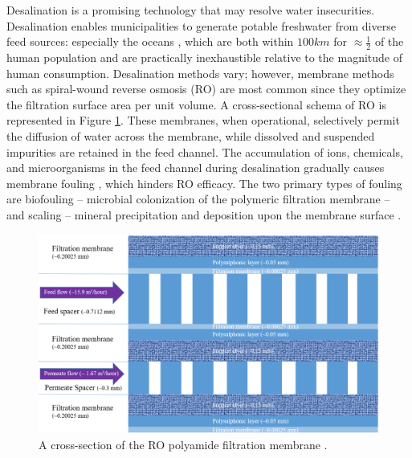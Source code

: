 Desalination is a promising technology that may resolve water insecurities. Desalination enables municipalities to generate potable freshwater from diverse feed sources: especially the oceans \cite{2018DepartmentWater,Service2006DesalinationUp}, which are both within $100 km$ for $\approx \frac{1}{2}$ of the human population \cite{Amy2017Membrane-basedProspects} and are practically inexhaustible relative to the magnitude of human consumption. Desalination methods vary; however, membrane methods such as spiral-wound reverse osmosis (RO) are most common since they optimize the filtration surface area  per unit volume. A cross-sectional schema of RO is represented in Figure \ref{membrane_schema}. These membranes, when operational, selectively permit the diffusion of water across the membrane, while dissolved and suspended impurities are retained in the feed channel. The accumulation of ions, chemicals, and microorganisms in the feed channel during desalination gradually causes membrane fouling \cite{Goosen2004FoulingReview}, which hinders RO efficacy. The two primary types of fouling are biofouling \cite{Characklis1983BiofilmsFouling} -- microbial colonization of the polymeric filtration membrane \cite{Garcia-Trinanes2021InvestigatingDevice,Suwarno2014BiofoulingDevelopment} -- and scaling -- mineral precipitation and deposition upon the membrane surface \cite{Warsinger2015ScalingReview,Khan2013SourceSea,Tang2014FoulingPlant,Shmulevsky2017AnalysisMembranes}. 

\begin{figure}[b]
    \centering
    \includegraphics[width = \textwidth]{images/Introduction/membrane_schema_3.PNG}
    \caption{
        A cross-section of the RO polyamide filtration membrane \cite{Strubbe2018CalibrationFull-Scale}. 
    }
    \label{membrane_schema}
\end{figure}

